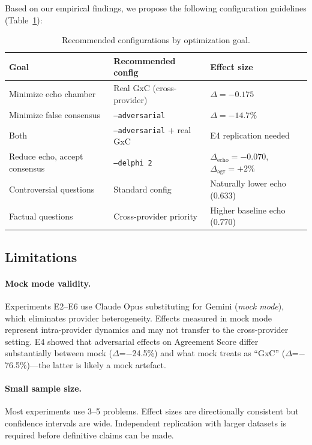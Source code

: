 \documentclass[11pt]{article}
\begin{document}
Based on our empirical findings, we propose the following configuration guidelines (Table~\ref{tab:guidelines}):

\begin{table}[h]
\centering
\caption{Recommended configurations by optimization goal.}
\label{tab:guidelines}
\begin{tabular}{lll}
\toprule
Goal & Recommended config & Effect size \\
\midrule
Minimize echo chamber & Real GxC (cross-provider) & $\Delta = -0.175$ \\
Minimize false consensus & \texttt{--adversarial} & $\Delta = -14.7\%$ \\
Both & \texttt{--adversarial} + real GxC & E4 replication needed \\
Reduce echo, accept consensus & \texttt{--delphi 2} & $\Delta_\text{echo} = -0.070$, $\Delta_\text{agr} = +2\%$ \\
Controversial questions & Standard config & Naturally lower echo (0.633) \\
Factual questions & Cross-provider priority & Higher baseline echo (0.770) \\
\bottomrule
\end{tabular}
\end{table}

\subsection{Limitations}

\paragraph{Mock mode validity.} Experiments E2--E6 use Claude Opus substituting for Gemini (\textit{mock mode}), which eliminates provider heterogeneity. Effects measured in mock mode represent intra-provider dynamics and may not transfer to the cross-provider setting. E4 showed that adversarial effects on Agreement Score differ substantially between mock ($\Delta$=$-$24.5\%) and what mock treats as ``GxC'' ($\Delta$=$-$76.5\%)---the latter is likely a mock artefact.

\paragraph{Small sample size.} Most experiments use 3--5 problems. Effect sizes are directionally consistent but confidence intervals are wide. Independent replication with larger datasets is required before definitive claims can be made.
\end{document}

